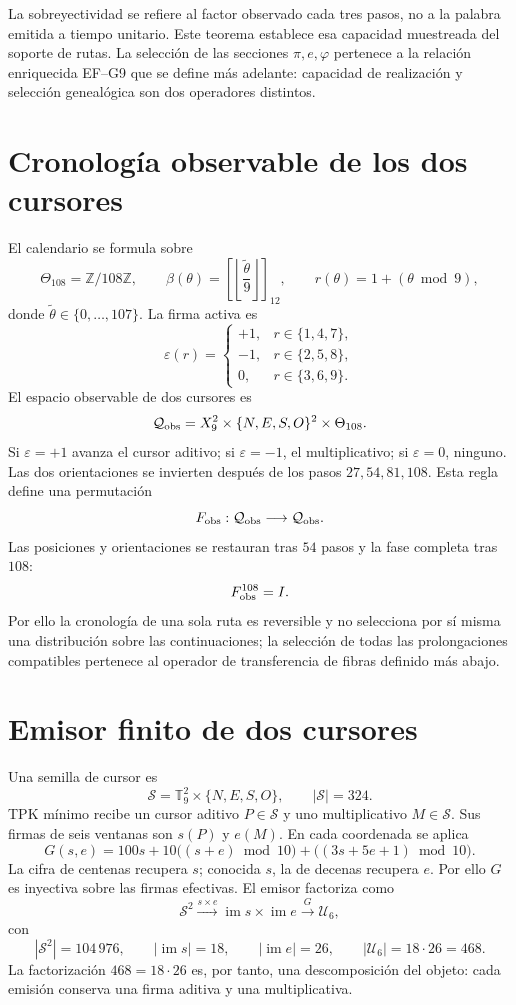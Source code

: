 La sobreyectividad se refiere al factor observado cada tres pasos, no a la
palabra emitida a tiempo unitario. Este teorema establece esa capacidad
muestreada del soporte de rutas. La selecci\'on de las secciones
\(\pi,e,\varphi\) pertenece a la relaci\'on enriquecida EF--G9 que se define
m\'as adelante: capacidad de realizaci\'on y selecci\'on geneal\'ogica son dos
operadores distintos.

\section{Cronología observable de los dos cursores}

El calendario se formula sobre
\[
 \Theta_{108}=\mathbb Z/108\mathbb Z,\qquad
 \beta(\theta)=
 \left[\left\lfloor\frac{\widetilde\theta}{9}\right\rfloor\right]_{12},
 \qquad
 r(\theta)=1+(\theta\bmod9),
\]
donde \(\widetilde\theta\in\{0,\ldots,107\}\). La firma activa es
\[
 \varepsilon(r)=
 \begin{cases}
 +1,&r\in\{1,4,7\},\\
 -1,&r\in\{2,5,8\},\\
 0,&r\in\{3,6,9\}.
 \end{cases}
\]
El espacio observable de dos cursores es
\[
 \mathcal Q_{\rm obs}
 =X_9^2\times\{N,E,S,O\}^2\times\Theta_{108}.
\]
Si \(\varepsilon=+1\) avanza el cursor aditivo; si
\(\varepsilon=-1\), el multiplicativo; si \(\varepsilon=0\), ninguno.
Las dos orientaciones se invierten después de los pasos
\(27,54,81,108\). Esta regla define una permutación
\[
 F_{\rm obs}:\mathcal Q_{\rm obs}\longrightarrow\mathcal Q_{\rm obs}.
\]
Las posiciones y orientaciones se restauran tras \(54\) pasos y la fase
completa tras \(108\):
\[
 F_{\rm obs}^{108}=I.
\]
Por ello la cronología de una sola ruta es reversible y no selecciona por sí
misma una distribución sobre las continuaciones; la selección de todas las
prolongaciones compatibles pertenece al operador de transferencia de fibras
definido más abajo.

\section{Emisor finito de dos cursores}

Una semilla de cursor es
\[
 \mathcal S=\mathbb T_9^2\times\{N,E,S,O\},
 \qquad |\mathcal S|=324.
\]
TPK m\'inimo recibe un cursor aditivo \(P\in\mathcal S\) y uno
multiplicativo \(M\in\mathcal S\). Sus firmas de seis ventanas son
\(s(P)\) y \(e(M)\). En cada coordenada se aplica
\[
 G(s,e)=100s+10\bigl((s+e)\bmod10\bigr)
       +\bigl((3s+5e+1)\bmod10\bigr).
\]
La cifra de centenas recupera \(s\); conocida \(s\), la de decenas recupera
\(e\). Por ello \(G\) es inyectiva sobre las firmas efectivas. El emisor
factoriza como
\[
 \mathcal S^2\xrightarrow{s\times e}
 \operatorname{im}s\times\operatorname{im}e
 \xrightarrow{G}\mathcal U_6,
\]
con
\[
 |\mathcal S^2|=104\,976,\qquad
 |\operatorname{im}s|=18,\qquad
 |\operatorname{im}e|=26,\qquad
 |\mathcal U_6|=18\cdot26=468.
\]
La factorizaci\'on \(468=18\cdot26\) es, por tanto, una descomposici\'on del
objeto: cada emisi\'on conserva una firma aditiva y una multiplicativa.

